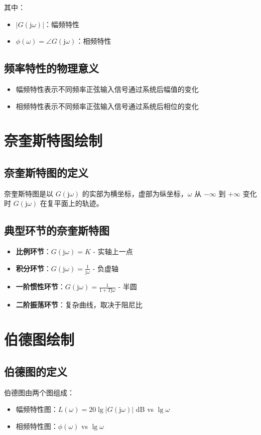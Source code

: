 \documentclass[12pt,a4paper]{article}
\newcommand{\jw}{\mathrm{j}\omega}
\begin{document}
其中：
\begin{itemize}
    \item $|G(\jw)|$：幅频特性
    \item $\phi(\omega) = \angle G(\jw)$：相频特性
\end{itemize}

\subsection{频率特性的物理意义}
\begin{itemize}
    \item 幅频特性表示不同频率正弦输入信号通过系统后幅值的变化
    \item 相频特性表示不同频率正弦输入信号通过系统后相位的变化
\end{itemize}

\section{奈奎斯特图绘制}

\subsection{奈奎斯特图的定义}
奈奎斯特图是以 $G(\jw)$ 的实部为横坐标，虚部为纵坐标，$\omega$ 从 $-\infty$ 到 $+\infty$ 变化时 $G(\jw)$ 在复平面上的轨迹。

\subsection{典型环节的奈奎斯特图}
\begin{itemize}
    \item \textbf{比例环节}：$G(\jw) = K$ - 实轴上一点
    \item \textbf{积分环节}：$G(\jw) = \frac{1}{\jw}$ - 负虚轴
    \item \textbf{一阶惯性环节}：$G(\jw) = \frac{1}{1+T\jw}$ - 半圆
    \item \textbf{二阶振荡环节}：复杂曲线，取决于阻尼比
\end{itemize}


\section{伯德图绘制}

\subsection{伯德图的定义}
伯德图由两个图组成：
\begin{itemize}
    \item 幅频特性图：$L(\omega) = 20\lg|G(\jw)|$ dB vs $\lg\omega$
    \item 相频特性图：$\phi(\omega)$ vs $\lg\omega$
\end{itemize}
\end{document}
